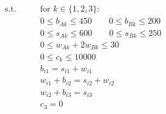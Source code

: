 \documentclass{homework}
\newcommand{\st}{\mathrm{s.t.}}
\begin{document}
\begin{enumerate}
\begin{enumerate}
\begin{tcolorbox}
\begin{align*}
					\st \qquad &	\text{for $k \in \{1, 2, 3\}$: } \\
					& 0 \le b_{Ak} \le 450  \qquad 0 \le b_{Bk} \le 200 \\
					& 0 \le s_{Ak} \le 600 \qquad 0 \le s_{Bk} \le 250 \\
					& 0 \le w_{Ak} + 2 w_{Bk} \le 30 \\
					& 0 \le c_k \le 10000 \\
					& b_{i1}  = s_{i1} + w_{i1} \\
					& w_{i1} + b_{i2} = s_{i2} + w_{i2} \\
					& w_{i2} + b_{i3}  = s_{i3} \\
					& c_3 = 0
				\end{align*}
				
			\end{tcolorbox}
		\end{enumerate}
	\end{enumerate}
\end{document}
